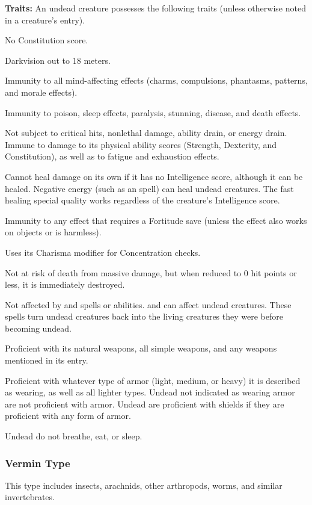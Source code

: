 \textbf{Traits:} An undead creature possesses the following traits (unless otherwise noted in a creature's entry).
\begin{itemize*}
\item No Constitution score.
\item Darkvision out to 18 meters.
\item Immunity to all mind-affecting effects (charms, compulsions, phantasms, patterns, and morale effects).
\item Immunity to poison, sleep effects, paralysis, stunning, disease, and death effects.
\item Not subject to critical hits, nonlethal damage, ability drain, or energy drain. Immune to damage to its physical ability scores (Strength, Dexterity, and Constitution), as well as to fatigue and exhaustion effects.
\item Cannot heal damage on its own if it has no Intelligence score, although it can be healed. Negative energy (such as an  spell) can heal undead creatures. The fast healing special quality works regardless of the creature's Intelligence score.
\item Immunity to any effect that requires a Fortitude save (unless the effect also works on objects or is harmless).
\item Uses its Charisma modifier for Concentration checks.
\item Not at risk of death from massive damage, but when reduced to 0 hit points or less, it is immediately destroyed.
\item Not affected by  and  spells or abilities.  and  can affect undead creatures. These spells turn undead creatures back into the living creatures they were before becoming undead.
\item Proficient with its natural weapons, all simple weapons, and any weapons mentioned in its entry.
\item Proficient with whatever type of armor (light, medium, or heavy) it is described as wearing, as well as all lighter types. Undead not indicated as wearing armor are not proficient with armor. Undead are proficient with shields if they are proficient with any form of armor.
\item Undead do not breathe, eat, or sleep.
\end{itemize*}

\subsubsection{Vermin Type}
This type includes insects, arachnids, other arthropods, worms, and similar invertebrates.

